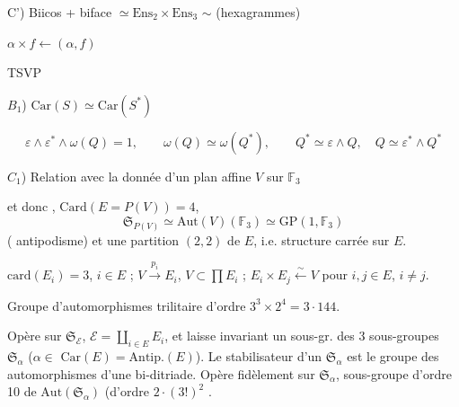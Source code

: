 \documentclass[11pt,a4paper]{article}
\begin{document}
C') Biicos + biface $\simeq \mathrm{Ens}_2 \times \mathrm{Ens}_3$  $\sim$ (hexagrammes)

\quad $\alpha \times f \longleftarrow (\alpha, f)$


TSVP


 $B_1$) \struck{\ill{}} $\mathrm{Car}(S) \simeq \mathrm{Car}(S^*)$

\[
  \varepsilon \wedge \varepsilon^* \wedge \omega(Q) = 1, \qquad \omega(Q) \simeq \omega(Q^*), \qquad
  Q^* \simeq \varepsilon \wedge Q,\quad Q \simeq \varepsilon^* \wedge Q^*
\]

$C_1$) Relation avec la donnée d'un  plan affine  $V$ sur $\mathbb{F}_3$

et donc , $\mathrm{Card}(E = P(V)) = 4$, 
\[
  \mathfrak{S}_{P(V)} \simeq \mathrm{Aut}(V)(\mathbb{F}_3) \simeq \mathrm{GP}(1, \mathbb{F}_3)
\]
( antipodisme) et une partition $(2,2)$ de $E$, i.e. structure carrée sur $E$.

$\mathrm{card}(E_i) = 3$, $i \in E$ ; $V \xrightarrow{p_i} E_i$, $V \subset \prod E_i$ ; $E_i \times E_j \xleftarrow{\sim} V$ pour $i, j \in E$, $i \neq j$.


Groupe d'automorphismes trilitaire d'ordre $3^3 \times 2^4 = 3 \cdot 144$.

Opère sur $\mathfrak{S}_{\mathcal{E}}$, $\mathcal{E} = \coprod_{i \in E} E_i$, et laisse invariant  un sous-gr. \ill{} des 3 sous-groupes $\mathfrak{S}_\alpha$ ($\alpha \in$ \struck{\ill{}} $\mathrm{Car}(E) = \mathrm{Antip.}(E)$). Le stabilisateur d'un $\mathfrak{S}_\alpha$ est le groupe des automorphismes d'une bi-ditriade. Opère fidèlement sur $\mathfrak{S}_\alpha$, sous-groupe d'ordre 10 de $\mathrm{Aut}(\mathfrak{S}_\alpha)$ (d'ordre $2 \cdot (3!)^2$ \uncertain{)}.


\end{document}
